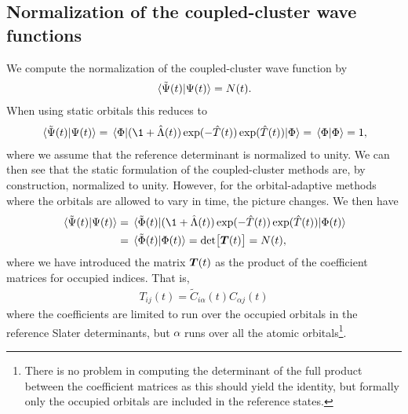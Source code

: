         \subsection{Normalization of the coupled-cluster wave functions}
            We compute the normalization of the coupled-cluster wave function by
            \begin{align}
                \braket*{\tilde{\Psi}(t)}{\Psi(t)} = N(t).
            \end{align}
            When using static orbitals this reduces to
            \begin{align}
                \braket*{\tilde{\Psi}(t)}{\Psi(t)}
                = \mel*{\slat}{
                    (\1 + \clustl(t))
                    \exponential(-\clust(t))
                    \exponential(\clust(t))
                }{\slat}
                = \braket*{\slat}{\slat}
                = 1,
            \end{align}
            where we assume that the reference determinant is normalized to
            unity.
            We can then see that the static formulation of the coupled-cluster
            methods are, by construction, normalized to unity.
            However, for the orbital-adaptive methods where the orbitals are
            allowed to vary in time, the picture changes.
            We then have
            \begin{align}
                \braket*{\tilde{\Psi}(t)}{\Psi(t)}
                &=
                \mel*{\tilde{\slat}(t)}{
                    (\1 + \clustl(t))
                    \exponential(-\clust(t))
                    \exponential(\clust(t))
                }{\slat(t)}
                \\
                &= \braket*{\tilde{\slat}(t)}{\slat(t)}
                = \det[\vfg{T}(t)]
                = N(t),
                \label{eq:norm-oatdcc}
            \end{align}
            where we have introduced the matrix $\boldsymbol{T}(t)$ as the product of
            the coefficient matrices for occupied indices.
            That is,
            \begin{align}
                T_{ij}(t) = \tilde{C}_{i\alpha}(t) C_{\alpha j}(t)
            \end{align}
            where the coefficients are limited to run over the occupied orbitals
            in the reference Slater determinants, but $\alpha$ runs over all the
            atomic orbitals\footnote{%
                There is no problem in computing the determinant of the full
                product between the coefficient matrices as this should yield
                the identity, but formally only the occupied orbitals are
                included in the reference states.
            }.
